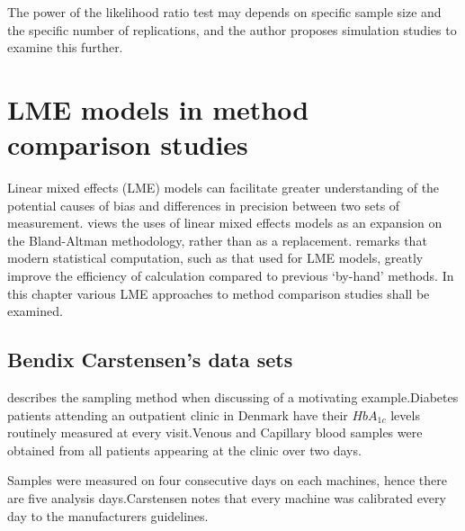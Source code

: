 \documentclass[12pt, a4paper]{report}
\theoremstyle{plain}
\theoremstyle{definition}
\theoremstyle{remark}
\begin{document}
The power of the
likelihood ratio test may depends on specific sample size and the
specific number of  replications, and the author proposes
simulation studies to examine this further.



\section{LME models in method comparison studies}

Linear mixed effects (LME) models can facilitate greater
understanding of the potential causes of bias and differences in
precision between two sets of measurement. \citet{LaiShiao} views
the uses of linear mixed effects models as an expansion on the
Bland-Altman methodology, rather than as a replacement.
\citet{BXC2008} remarks that modern statistical computation, such
as that used for LME models, greatly improve the efficiency of
calculation compared to previous `by-hand' methods. In this
chapter various LME approaches to method comparison studies shall
be examined.










\subsection{Bendix Carstensen's data sets}
\citet{bxc2008}describes the sampling method when discussing of a motivating example.Diabetes patients attending an outpatient clinic in Denmark have their $HbA_{1c}$ levels routinely measured at every visit.Venous and Capillary blood samples were obtained from all patients appearing at the clinic over two days.

Samples were measured on four consecutive days on each machines, hence there are five analysis days.Carstensen notes that every machine was calibrated every day to  the manufacturers guidelines.



\end{document}
